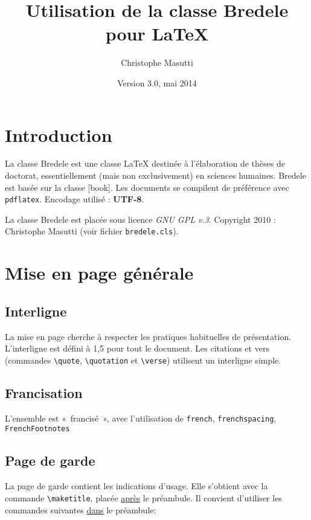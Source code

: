\documentclass[10pt,a4paper]{article}
\title{Utilisation de la classe Bredele pour \LaTeX}
\author{Christophe Masutti}
\date{Version 3.0, mai 2014}
\begin{document}
\maketitle

\tableofcontents

\newpage

\section{Introduction}
La classe Bredele est une classe \LaTeX{} destinée à l'élaboration de thèses de doctorat, essentiellement (mais non exclusivement) en sciences humaines. Bredele est basée sur la classe [book]. Les documents se compilent de préférence avec \verb!pdflatex!. Encodage utilisé : \textbf{UTF-8}.

La classe Bredele est placée sous licence \textit{GNU GPL v.3}. Copyright 2010 : Christophe Masutti (voir fichier \verb!bredele.cls!).

\section{Mise en page générale}

\subsection{Interligne}
La mise en page cherche à respecter les pratiques habituelles de présentation. L'interligne est défini à 1,5 pour tout le document. Les citations et vers (commandes \verb!\quote!, \verb!\quotation! et \verb!\verse!) utilisent un interligne simple.

\subsection{Francisation}
L'ensemble est «~francisé~», avec l'utilisation de \verb!french!, \verb!frenchspacing!, \verb!FrenchFootnotes!

\subsection{Page de garde}
La page de garde contient les indications d'usage. Elle s'obtient avec la commande \verb!\maketitle!, placée \underline{après} le préambule. Il convient d'utiliser les commandes suivantes \underline{dans} le préambule:
\end{document}
